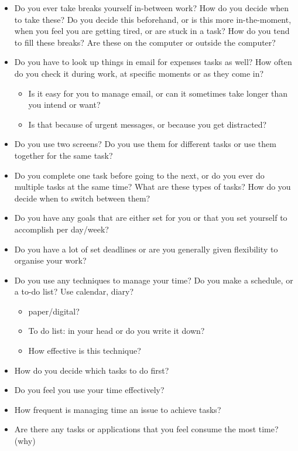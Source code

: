 \begin{itemize}
\item Do you ever take breaks yourself in-between work? How do you decide when to take these? Do you decide this beforehand, or is this more in-the-moment, when you feel you are getting tired, or are stuck in a task? How do you tend to fill these breaks? Are these on the computer or outside the computer?
\item Do you have to look up things in email for expenses tasks as well? How often do you check it during work, at specific moments or as they come in?
\begin{itemize}
\item Is it easy for you to manage email, or can it sometimes take longer than you intend or want?
\item Is that because of urgent messages, or because you get distracted?
\end{itemize}
\item Do you use two screens? Do you use them for different tasks or use them together for the same task?
\item Do you complete one task before going to the next, or do you ever do multiple tasks at the same time? What are these types of tasks? How do you decide when to switch between them?
\item Do you have any goals that are either set for you or that you set yourself to accomplish per day/week?
\item Do you have a lot of set deadlines or are you generally given flexibility to organise your work?
\item Do you use any techniques to manage your time? Do you make a schedule, or a to-do list? Use calendar, diary?
\begin{itemize}
\item paper/digital?
\item To do list: in your head or do you write it down?
\item How effective is this technique?
\end{itemize}
\item How do you decide which tasks to do first?
\item Do you feel you use your time effectively?
\item How frequent is managing time an issue to achieve tasks?
\item Are there any tasks or applications that you feel consume the most time? (why)
 \end{itemize}

